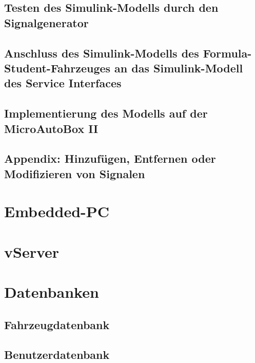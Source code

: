 \documentclass[fontsize = 12pt, paper = a4]{scrreprt}
\begin{document}
\subsection{Testen des Simulink-Modells durch den Signalgenerator}



\subsection{Anschluss des Simulink-Modells des Formula-Student-Fahrzeuges an das Simulink-Modell des Service Interfaces}


\subsection{Implementierung des Modells auf der MicroAutoBox II}


\subsection{Appendix: Hinzufügen, Entfernen oder Modifizieren von Signalen}





\section{Embedded-PC}

\section{vServer}

\section{Datenbanken}

\subsection{Fahrzeugdatenbank}

\subsection{Benutzerdatenbank}
\end{document}
